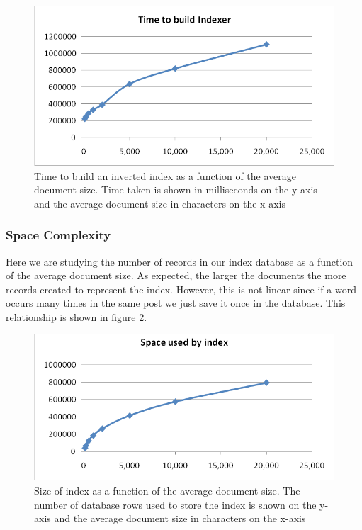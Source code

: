 \documentclass[10pt]{report}
\begin{document}
\begin{itemize}
  \begin{figure}[h!]
    \begin{center}
      \includegraphics[width=\textwidth,height=!]{docsizetimecomplexbuildindex}
    \end{center}
    \caption{Time to build an inverted index as a function of the
      average document size. Time taken is shown in milliseconds on the
      y-axis and the average document size in characters on the x-axis} 
    \label{fig:docsizetimecomplexbuildindex}
  \end{figure} 

\end{itemize}


\subsubsection{Space Complexity}
Here we are studying the number of records in our index database as a
function of the average document size. As expected, the larger the documents
the more records created to represent the index. However, this is not linear
since if a word occurs many times in the same post we just save it
once in the database. This relationship is shown in figure
\ref{fig:docsizespacecomplexbuildindex}. 

\begin{figure}[h!]
  \begin{center}
    \includegraphics[width=\textwidth,height=!]{docsizespacecomplexbuildindex}
  \end{center}
  \caption{Size of index as a function of the average document
    size. The number of database rows used to store the index is
      shown on the y-axis and the average document size in characters
      on the x-axis}  
  \label{fig:docsizespacecomplexbuildindex}
\end{figure} 
\end{document}
